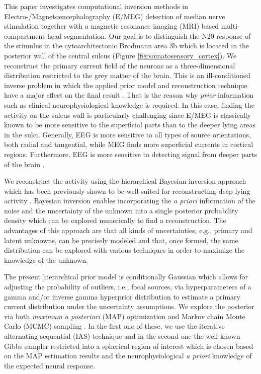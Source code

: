 \documentclass[5p]{elsarticle}
\begin{document}
This paper investigates computational inversion methods in Electro-/Magneto\-en\-cephalo\-graphy (E/MEG) \cite{hamalainen1993,niedermeyer2004} detection of median nerve stimulation together with a magnetic resonance imaging (MRI) based multi-compartment head segmentation. Our goal is to distinguish the N20 response of the stimulus in the cytoarchitectonic Brodmann area 3b \cite{haueisen2007identifying,buchner1994source,hari2018ifcn,baumgartner2010dipole} which is located in the posterior wall of the central sulcus (Figure \ref{fig:somatosensory_cortex}). We reconstruct the primary current field of the neurons as a three-dimensional distribution restricted to the grey matter of the brain. This is an ill-conditioned inverse problem in which the applied prior model and reconstruction technique have a major effect on  the final result \cite{brette2012}. That is the reason why {\em prior} information such as clinical neurophysiological knowledge is required. In this case, finding the activity on the sulcus wall is particularly challenging since E/MEG is classically known to be more sensitive to the superficial parts than to the deeper lying areas in the sulci.
Generally, EEG \cite{ahlfors2010sensitivity} is more sensitive to all types of source orientations, both radial and tangential, while MEG finds more superficial currents in cortical regions. Furthermore, EEG is more sensitive to detecting signal from deeper parts of the brain \cite{hari2018ifcn}.

We reconstruct the activity using the hierarchical Bayesian inversion approach which has been previously shown to be well-suited for reconstructing deep lying activity \citep{calvetti2009,lucka2012,calvetti2018,calvetti2015}.   Bayesian inversion \citep{kaipio2004,calvetti2007,baillet1997bayesian,trujillo2004bayesian,schmidt1999bayesian} enables incorporating the {\em a priori} information of the noise and the uncertainty of the unknown into a single posterior probability density  which can be explored numerically to find a reconstruction. The advantages of this approach are that all kinds of uncertainties, e.g., primary and latent unknowns, can be precisely modeled and that, once formed, the same distribution can be explored with various techniques in order to maximize the knowledge of the unknown. 

The present hierarchical prior model \citep{ohagan2004,calvetti2009,lucka2012} is conditionally Gaussian which allows for adjusting the probability of outliers, i.e., focal sources, via hyperparameters of a gamma and/or inverse gamma hyperprior distribution to estimate a primary current distribution under the uncertainty assumptions. We explore the posterior via both {\em maximum a posteriori} (MAP) optimization and Markov chain Monte Carlo (MCMC) sampling \citep{gelman1995bayesian,liu2001}. In the first one of these, we use the iterative alternating sequential (IAS) technique and in the second one the well-known Gibbs sampler restricted into a spherical region of interest which is chosen based on the MAP estimation results and the neurophysiological {\em a priori} knowledge of the expected neural response. 
\end{document}
